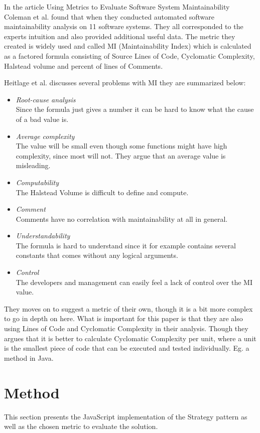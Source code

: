 \documentclass[conference, a4paper]{IEEEtran}
\begin{document}
In the article Using Metrics to Evaluate Software System Maintainability Coleman et al. found that when they conducted automated software maintainability analysis on 11 software systems. They all corresponded to the experts intuition and also provided additional useful data. The metric they created is widely used and called MI (Maintainability Index) which is calculated as a factored formula consisting of Source Lines of Code, Cyclomatic Complexity, Halstead volume and percent of lines of Comments.~\cite{bibitem:MetricsToEvaluate}

Heitlage et al. discusses several problems with MI they are summarized below:
\begin{itemize}
    \item \emph{Root-cause analysis} \\
    Since the formula just gives a number it can be hard to know what the cause of a bad value is.
    \item \emph{Average complexity} \\
    The value will be small even though some functions might have high complexity, since most will not. They argue that an average value is misleading.
    \item \emph{Computability} \\
		The Halstead Volume is difficult to define and compute.
    \item \emph{Comment} \\
		Comments have no correlation with maintainability at all in general.
    \item \emph{Understandability} \\
		The formula is hard to understand since it for example contains several constants that comes without any logical arguments.
		\item \emph{Control} \\
		The developers and management can easily feel a lack of control over the MI value.
\end{itemize}
They moves on to suggest a metric of their own, though it is a bit more complex to go in depth on here. What is important for this paper is that they are also using Lines of Code and Cyclomatic Complexity in their analysis. Though they argues that it is better to calculate Cyclomatic Complexity per unit, where a unit is the smallest piece of code that can be executed and tested individually. Eg. a method in Java.~\cite{bibitem:Maintainability}

\section{Method}
This section presents the JavaScript implementation of the Strategy pattern as well as the chosen metric to evaluate the solution.
\end{document}
